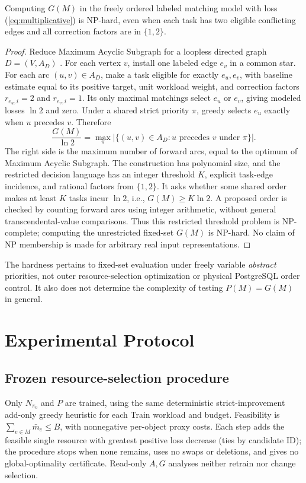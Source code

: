 \documentclass[sigconf, nonacm]{acmart}
\begin{document}
\begin{proposition}
\label{prop:shared-hardness}
Computing $G(M)$ in the freely ordered labeled
matching model with loss (\ref{eq:multiplicative})
is NP-hard, even when each task has two eligible
conflicting edges and all correction factors are
in $\{1,2\}$.
\end{proposition}
\begin{proof}
Reduce Maximum Acyclic Subgraph for a loopless
directed graph $D=(V,A_D)$
\cite{karp1972reducibility}. For each vertex $v$,
install one labeled edge $e_v$ in a common star.
For each arc $(u,v)\in A_D$, make a task eligible
for exactly $e_u,e_v$, with baseline estimate equal
to its positive target, unit workload weight, and
correction factors $r_{e_u,i}=2$ and $r_{e_v,i}=1$.
Its only maximal matchings select $e_u$ or $e_v$,
giving modeled losses $\ln 2$ and zero. Under a
shared strict priority $\pi$, greedy selects $e_u$
exactly when $u$ precedes $v$. Therefore
\[
\frac{G(M)}{\ln 2}=
\max_{\pi}|\{(u,v)\in A_D:u\text{ precedes }v\text{ under }\pi\}|.
\]
The right side is the maximum number of forward
arcs, equal to the optimum of Maximum Acyclic
Subgraph. The construction has polynomial size,
and the restricted decision language has an
integer threshold $K$, explicit task-edge incidence,
and rational factors from $\{1,2\}$. It asks
whether some shared order makes at least $K$
tasks incur $\ln 2$, i.e., $G(M)\geq K\ln 2$.
A proposed order is checked by counting forward
arcs using integer arithmetic, without general
transcendental-value comparisons. Thus this
restricted threshold problem is NP-complete;
computing the unrestricted fixed-set $G(M)$
is NP-hard. No claim of NP membership is
made for arbitrary real input representations.
\end{proof}
The hardness pertains to fixed-set evaluation
under freely variable \emph{abstract} priorities,
not outer resource-selection optimization or
physical PostgreSQL order control. It also does
not determine the complexity of testing
$P(M)=G(M)$ in general.

\section{Experimental Protocol}
\label{sec:protocol}
\subsection{Frozen resource-selection procedure}
Only \(N_{\pi_0}\) and \(P\) are trained, using the same deterministic
strict-improvement add-only greedy heuristic for each Train workload
and budget. Feasibility is \(\sum_{e\in M}\bar m_e\leq B\), with
nonnegative per-object proxy costs. Each step adds the feasible
single resource with greatest positive loss decrease (ties by
candidate ID); the procedure stops when none remains, uses no swaps
or deletions, and gives no global-optimality certificate. Read-only
\(A,G\) analyses neither retrain nor change selection.
\end{document}
